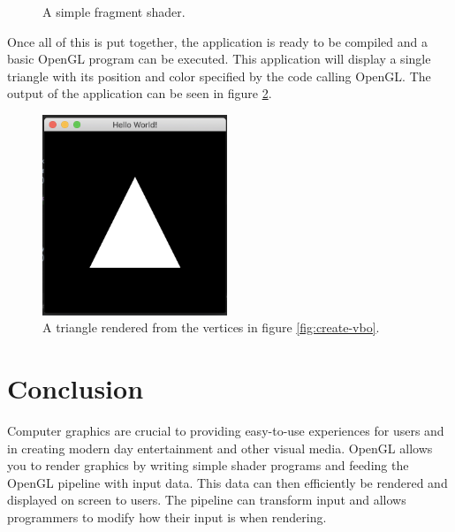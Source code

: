 \documentclass{article}
\begin{document}
\begin{figure}[h]
	
	\caption{A simple fragment shader.}
	\label{fig:fragment-shader}
\end{figure}

Once all of this is put together, the application is ready to be compiled and a basic OpenGL program can be executed. This application will display a single triangle with its position and color specified by the code calling OpenGL. The output of the application can be seen in figure \ref{fig:final-product}.

\begin{figure}[h]
    \centering
    \includegraphics[height=6cm]{triangle}
	\caption{A triangle rendered from the vertices in figure \ref{fig:create-vbo}.}
	\label{fig:final-product}
\end{figure}

\section{Conclusion}
Computer graphics are crucial to providing easy-to-use experiences for users and in creating modern day entertainment and other visual media. OpenGL allows you to render graphics by writing simple shader programs and feeding the OpenGL pipeline with input data. This data can then efficiently be rendered and displayed on screen to users. The pipeline can transform input and allows programmers to modify how their input is when rendering.

\clearpage

{}

\end{document}
